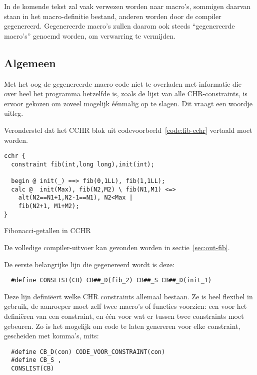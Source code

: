 In de komende tekst zal vaak verwezen worden naar macro's, sommigen daarvan staan in het macro-definitie bestand, anderen worden door de compiler gegenereerd. Gegenereerde macro's zullen daarom ook steeds ``gegenereerde macro's'' genoemd worden, om verwarring te vermijden.

\subsection{Algemeen} \label{sec:gencode-alg}

Met het oog de gegenereerde macro-code niet te overladen met informatie die over heel het programma hetzelfde is, zoals de lijst van alle CHR-constraints, is ervoor gekozen om zoveel mogelijk \'e\'enmalig op te slagen. Dit vraagt een woordje uitleg.

Veronderstel dat het CCHR blok uit codevoorbeeld~\ref{code:fib-cchr} vertaald moet worden.
\begin{exCode}
\begin{Verbatim}[frame=single]
cchr {
  constraint fib(int,long long),init(int);

  begin @ init(_) ==> fib(0,1LL), fib(1,1LL);
  calc @  init(Max), fib(N2,M2) \ fib(N1,M1) <=>
    alt(N2==N1+1,N2-1==N1), N2<Max |
    fib(N2+1, M1+M2);
}
\end{Verbatim}
\caption{Fibonacci-getallen in CCHR}
\label{code:fib-cchr}
\end{exCode}
De volledige compiler-uitvoer kan gevonden worden in sectie~\ref{sec:out-fib}.

De eerste belangrijke lijn die gegenereerd wordt is deze: 
\begin{Verbatim}
  #define CONSLIST(CB) CB##_D(fib_2) CB##_S CB##_D(init_1)
\end{Verbatim}
Deze lijn defini\"eert welke CHR constraints allemaal bestaan. Ze is heel flexibel in gebruik, de aanroeper moet zelf twee macro's of functies voorzien: een voor het defini\"eren van een constraint, en \'e\'en voor wat er tussen twee constraints moet gebeuren. Zo is het mogelijk om code te laten genereren voor elke constraint, gescheiden met komma's, mits: \begin{Verbatim}
  #define CB_D(con) CODE_VOOR_CONSTRAINT(con)
  #define CB_S ,
  CONSLIST(CB)
\end{Verbatim}

